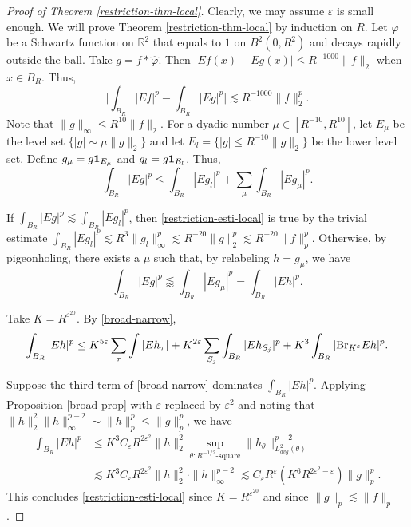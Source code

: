 \documentclass{amsart}%
\numberwithin{equation}{section}
\newcommand{\e}{\varepsilon}
\newcommand{\vp}{\varphi}
\newcommand{\wh}{\widehat}
\newcommand{\ZR}{\mathbb{R}}
\newcommand{\Id}{{\bf{1}}}
\newcommand{\Br}{{\rm{Br}}}
\newcommand{\1}{\mathbbm{1}}
\begin{document}
\begin{proof}[Proof of Theorem \ref{restriction-thm-local}]
	Clearly, we may assume $\e$ is small enough.
	We will prove Theorem \ref{restriction-thm-local} by induction on $R$.
	Let $\vp$ be a Schwartz function on $\ZR^2$ that equals to $1$ on $B^2(0,R^2)$ and decays rapidly outside the ball.
	Take $g=f\ast\wh\vp$.
	Then $|Ef(x)-Eg(x)|\leq R^{-1000} \|f\|_2$ when $x\in B_R$.
	Thus, 
	\begin{equation}
		\nonumber
		\Big|\int_{B_R}|Ef|^p-\int_{B_R}|Eg|^p\Big|\lesssim R^{-1000}\|f\|_2^p.
	\end{equation}
	Note that $\|g\|_\infty \leq R^{10}\|f\|_2$.
	For a dyadic number $\mu\in[R^{-10}, R^{10}]$, let $E_\mu$ be the level set $\{|g|\sim\mu\|g\|_2\}$ and let $E_l=\{|g|\leq R^{-10}\|g\|_2\}$ be the lower level set.
	Define $g_\mu=g\Id_{E_\mu}$ and $g_l=g\Id_{E_l}$.
	Thus,
	\begin{equation}
		\nonumber
		\int_{B_R}|Eg|^p\leq\int_{B_R}|Eg_l|^p+\sum_\mu\int_{B_R}|Eg_\mu|^p.
	\end{equation}
	
	If $\int_{B_R}|Eg|^p\lesssim\int_{B_R}|Eg_l|^p$, then \eqref{restriction-esti-local} is true by the trivial estimate $\int_{B_R}|Eg_l|^p\lesssim R^3\|g_l\|_\infty^p\lesssim R^{-20}\|g\|_2^p\lesssim R^{-20}\|f\|_p^p$.
	Otherwise, by pigeonholing, there exists a $\mu$ such that, by relabeling $h=g_\mu$, we have
	\begin{equation}
		\nonumber
		\int_{B_R}|Eg|^p\lessapprox\int_{B_R}|Eg_\mu|^p=\int_{B_R}|Eh|^p.
	\end{equation}
	
	
	\smallskip
	
	
	
	
	Take $K=R^{\e^{20}}$.
	By \eqref{broad-narrow},
	\begin{align}
		\label{broad-narrow-application}
		\int_{B_R}|Eh|^p\leq K^{5\e}\sum_\tau\int|Eh_{\tau}|+ K^{2\e} \sum_{S_j}\int_{B_R}|Eh_{S_j}|^p+K^{3}\int_{B_R}|\Br_{K^\e} Eh|^p.
	\end{align}
	
	\medskip
	
	Suppose the third term of \eqref{broad-narrow} dominates $\int_{B_R}|Eh|^p$.
	Applying Proposition \ref{broad-prop} with $\e$ replaced by  $\e^2$ and noting that $\|h\|_2^2\|h\|_\infty^{p-2}\sim\|h\|_p^p\leq \|g\|_p^p$, we have
	\begin{align}
		\nonumber
		\int_{B_R}|Eh|^p&\leq K^3 C_\e R^{2\e^2}\|h\|_2^2\sup_{\theta:R^{-1/2}\text{-square}}\|h_\theta\|_{L^2_{avg}(\theta)}^{p-2}\\ \nonumber
		&\lesssim  K^3 C_\e R^{2\e^2}\|h\|_2^2\cdot\|h\|_\infty^{p-2}\lesssim C_\e R^{\e}(K^6R^{2\e^2-\e})\|g\|_p^p.
	\end{align}
	This concludes \eqref{restriction-esti-local} since $K=R^{\e^{20}}$ and since $\|g\|_p\lesssim\|f\|_p$.
	

\end{proof}
\end{document}
